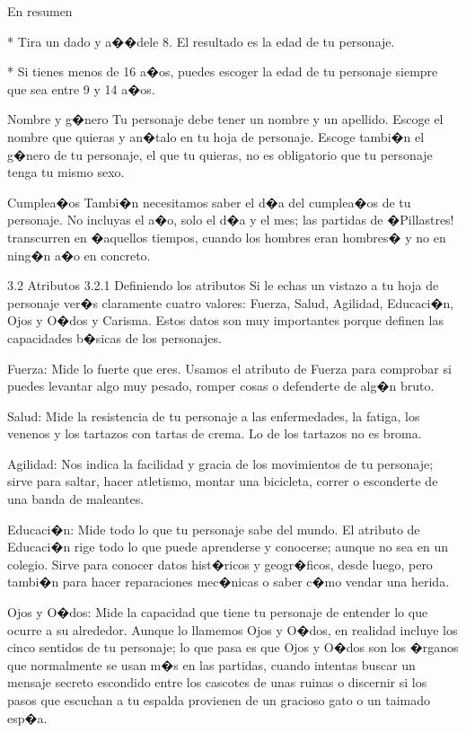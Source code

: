 En resumen


* Tira un dado y a��dele 8. El resultado es la edad de tu personaje.


* Si tienes menos de 16 a�os, puedes escoger la edad de tu personaje siempre que sea entre 9 y 14 a�os.


Nombre y g�nero
Tu personaje debe tener un nombre y un apellido. Escoge el nombre que quieras y an�talo en tu hoja de personaje. 
Escoge tambi�n el g�nero de tu personaje, el que tu quieras, no es obligatorio que tu personaje tenga tu mismo sexo.


Cumplea�os
Tambi�n necesitamos saber el d�a del cumplea�os de tu personaje. No incluyas el a�o, solo el d�a y el mes; las partidas de �Pillastres! transcurren en �aquellos tiempos, cuando los hombres eran hombres� y no en ning�n a�o en concreto.


3.2 Atributos
3.2.1 Definiendo los atributos
Si le echas un vistazo a tu hoja de personaje ver�s claramente cuatro valores: Fuerza, Salud, Agilidad, Educaci�n, Ojos y O�dos y Carisma. Estos datos son muy importantes porque definen las capacidades b�sicas de los personajes.


Fuerza: 
Mide lo fuerte que eres. Usamos el atributo de Fuerza para comprobar si puedes levantar algo muy pesado, romper cosas o defenderte de alg�n bruto.


Salud: 
Mide la resistencia de tu personaje a las enfermedades, la fatiga, los venenos y los tartazos con tartas de crema. Lo de los tartazos no es broma.


Agilidad: 
Nos indica la facilidad y gracia de los movimientos de tu personaje; sirve para saltar, hacer atletismo, montar una bicicleta, correr o esconderte de una banda de maleantes.


Educaci�n: 
Mide todo lo que tu personaje sabe del mundo. El atributo de Educaci�n rige todo lo que puede aprenderse y conocerse; aunque no sea en un colegio. Sirve para conocer datos hist�ricos y geogr�ficos, desde luego, pero tambi�n para hacer reparaciones mec�nicas o saber c�mo vendar una herida.


Ojos y O�dos: 
Mide la capacidad que tiene tu personaje de entender lo que ocurre a su alrededor. Aunque lo llamemos Ojos y O�dos, en realidad incluye los cinco sentidos de tu personaje; lo que pasa es que Ojos y O�dos son los �rganos que normalmente se usan m�s en las partidas, cuando intentas buscar un mensaje secreto escondido entre los cascotes de unas ruinas o discernir si los pasos que escuchan a tu espalda provienen de un gracioso gato o un taimado esp�a.


